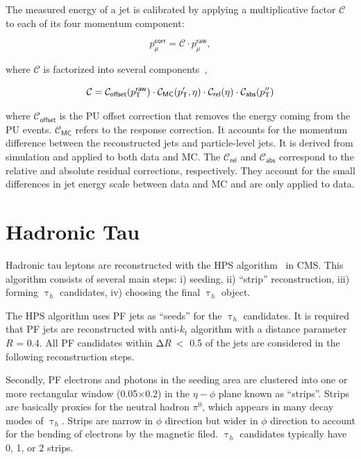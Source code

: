 The measured energy of a jet is calibrated by applying a multiplicative factor $\mathcal{C}$ to each of its four momentum component:

\begin{equation}
p^{\textsf{corr}}_{\mu} = \mathcal{C}\cdot p^{\textsf{raw}}_{\mu},
\end{equation}

where $\mathcal{C}$ is factorized into several components~\cite{CMS:2011shu},

\begin{equation}
\mathcal{C} = \mathcal{C}_{\textsf{offset}}(p_{\textsf{T}}^{\textsf{raw}})\cdot\mathcal{C}_{\textsf{MC}}(p_{\textsf{T}}^{\prime},\eta)\cdot\mathcal{C}_{\textsf{rel}}(\eta)\cdot\mathcal{C}_{\textsf{abs}}(p_{\textsf{T}}^{\prime\prime})
\end{equation}

where $\mathcal{C}_{\textsf{offset}}$ is the \ac{PU} offset correction that removes the energy coming from the \ac{PU} events. $\mathcal{C}_{\textsf{MC}}$ refers to the response correction. It accounts for the momentum difference between the reconstructed jets and particle-level jets. It is derived from simulation and applied to both data and \ac{MC}. The $\mathcal{C}_{\textsf{rel}}$ and $\mathcal{C}_{\textsf{abs}}$ correspond to the relative and absolute residual corrections, respectively. They account for the small differences in jet energy scale between data and \ac{MC} and are only applied to data.

\section{Hadronic Tau}
\label{sec:Tau}

Hadronic tau leptons are reconstructed with the \ac{HPS} algorithm~\cite{CMS:2011eio} in \ac{CMS}. This algorithm consists of several main steps: i) seeding, ii) ``strip'' reconstruction, iii) forming $\uptau_{h}$ candidates, iv) choosing the final $\uptau_{h}$ object.

The \ac{HPS} algorithm uses \ac{PF} jets as ``seeds'' for the $\uptau_h$ candidates. It is required that \ac{PF} jets are reconstructed with anti-$k_t$ algorithm with a distance parameter $R$ = 0.4. All \ac{PF} candidates within $\mathrm{\Delta}R~<$ 0.5 of the jets are considered in the following reconstruction steps.

Secondly, \ac{PF} electrons and photons in the seeding area are clustered into one or more rectangular window (0.05$\times$0.2) in the $\eta-\phi$ plane known as ``strips''. Strips are basically proxies for the neutral hadron $\pi^0$, which appears in many decay modes of $\uptau_h$. Strips are narrow in $\phi$ direction but wider in $\phi$ direction to account for the bending of electrons by the magnetic filed. $\uptau_h$ candidates typically have 0, 1, or 2 strips. 

